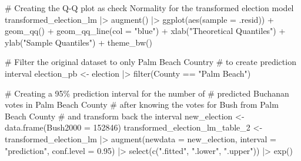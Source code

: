 \documentclass[
  letterpaper,
  DIV=11,
  numbers=noendperiod]{scrartcl}
\newenvironment{Shaded}{\begin{snugshade}}{\end{snugshade}}
\newcommand{\AttributeTok}[1]{\textcolor[rgb]{0.40,0.45,0.13}{#1}}
\newcommand{\CommentTok}[1]{\textcolor[rgb]{0.37,0.37,0.37}{#1}}
\newcommand{\DecValTok}[1]{\textcolor[rgb]{0.68,0.00,0.00}{#1}}
\newcommand{\FloatTok}[1]{\textcolor[rgb]{0.68,0.00,0.00}{#1}}
\newcommand{\FunctionTok}[1]{\textcolor[rgb]{0.28,0.35,0.67}{#1}}
\newcommand{\NormalTok}[1]{\textcolor[rgb]{0.00,0.23,0.31}{#1}}
\newcommand{\OtherTok}[1]{\textcolor[rgb]{0.00,0.23,0.31}{#1}}
\newcommand{\SpecialCharTok}[1]{\textcolor[rgb]{0.37,0.37,0.37}{#1}}
\newcommand{\StringTok}[1]{\textcolor[rgb]{0.13,0.47,0.30}{#1}}
\begin{document}
\begin{Shaded}
\begin{Highlighting}[]
\CommentTok{\# Creating the Q{-}Q plot as check Normality for the transformed election model}
\NormalTok{transformed\_election\_lm }\SpecialCharTok{|\textgreater{}}
  \FunctionTok{augment}\NormalTok{() }\SpecialCharTok{|\textgreater{}}
  \FunctionTok{ggplot}\NormalTok{(}\FunctionTok{aes}\NormalTok{(}\AttributeTok{sample =}\NormalTok{ .resid)) }\SpecialCharTok{+}
  \FunctionTok{geom\_qq}\NormalTok{() }\SpecialCharTok{+}
  \FunctionTok{geom\_qq\_line}\NormalTok{(}\AttributeTok{col =} \StringTok{"blue"}\NormalTok{) }\SpecialCharTok{+}
  \FunctionTok{xlab}\NormalTok{(}\StringTok{"Theoretical Quantiles"}\NormalTok{) }\SpecialCharTok{+}
  \FunctionTok{ylab}\NormalTok{(}\StringTok{"Sample Quantiles"}\NormalTok{) }\SpecialCharTok{+}
  \FunctionTok{theme\_bw}\NormalTok{()}

\CommentTok{\# Filter the original dataset to only Palm Beach Country}
\CommentTok{\# to create prediction interval}
\NormalTok{election\_pb }\OtherTok{\textless{}{-}}\NormalTok{ election }\SpecialCharTok{|\textgreater{}} \FunctionTok{filter}\NormalTok{(County }\SpecialCharTok{==} \StringTok{"Palm Beach"}\NormalTok{)}

\CommentTok{\# Creating a 95\% prediction interval for the number of}
\CommentTok{\# predicted Buchanan votes in Palm Beach County}
\CommentTok{\# after knowing the votes for Bush from Palm Beach County}
\CommentTok{\# and transform back the interval}
\NormalTok{new\_election }\OtherTok{\textless{}{-}} \FunctionTok{data.frame}\NormalTok{(}\AttributeTok{Bush2000 =} \DecValTok{152846}\NormalTok{)}
\NormalTok{transformed\_election\_lm\_table\_2 }\OtherTok{\textless{}{-}}\NormalTok{ transformed\_election\_lm }\SpecialCharTok{|\textgreater{}}
  \FunctionTok{augment}\NormalTok{(}\AttributeTok{newdata =}\NormalTok{ new\_election,}
          \AttributeTok{interval =} \StringTok{"prediction"}\NormalTok{,}
          \AttributeTok{conf.level =} \FloatTok{0.95}\NormalTok{) }\SpecialCharTok{|\textgreater{}}
  \FunctionTok{select}\NormalTok{(}\FunctionTok{c}\NormalTok{(}\StringTok{".fitted"}\NormalTok{, }\StringTok{".lower"}\NormalTok{, }\StringTok{".upper"}\NormalTok{)) }\SpecialCharTok{|\textgreater{}} \FunctionTok{exp}\NormalTok{()}


\end{Highlighting}
\end{Shaded}
\end{document}
